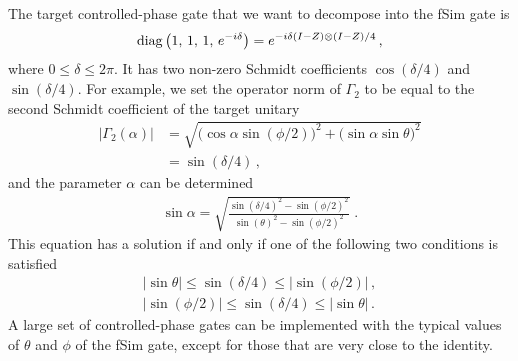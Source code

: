 The target controlled-phase gate that we want to decompose into the {\rm fSim} gate is
\begin{align}
\operatorname{diag}\big(1,\, 1,\, 1,\, e^{-i\delta}\big) = e^{-i\delta(I-Z)\otimes (I-Z)/4} \,,
\end{align}
where $0\leq\delta\leq 2\pi$.  It has two non-zero Schmidt coefficients  $\cos(\delta/4)$ and $\sin(\delta/4)$.  For example, we set the operator norm of $\Gamma_2$ to be equal to the second Schmidt coefficient of the target unitary
\begin{align}
\big\lvert\Gamma_2(\alpha)\big\rvert &= \sqrt{\big(\cos\alpha\sin(\phi/2)\big)^2 + \big(\sin\alpha\sin\theta\big)^2}\nonumber\\[3pt]
&= \sin(\delta/4)\,,\label{cz_to_syc:eq:second_sch_coeff}
\end{align}
and the parameter $\alpha$ can be determined
\begin{align}\label{cz_to_syc:eq:alpha}
\sin\alpha = \sqrt{\frac{\sin(\delta/4)^2 - \sin(\phi/2)^2}{\sin(\theta)^2-\sin(\phi/2)^2}}\;.
\end{align}
This equation has a solution if and only if one of the following two conditions is satisfied
\begin{align}
\lvert\sin\theta\rvert \leq \sin(\delta/4) \leq \lvert\sin(\phi/2)\rvert\,,\\[3pt]
\lvert\sin(\phi/2)\rvert\leq \sin(\delta/4)  \leq \lvert\sin\theta\rvert \,.
\end{align}
A large set of controlled-phase gates can be implemented with the typical values of $\theta$ and $\phi$ of the {\rm fSim} gate, except for those that are very close to the identity. 

